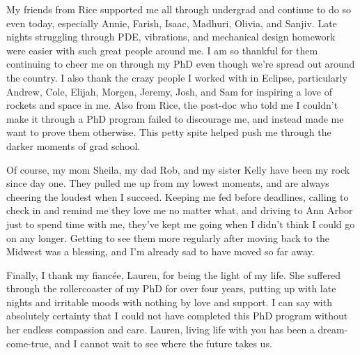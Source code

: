 My friends from Rice supported me all through undergrad and continue to do so even today, especially Annie, Farish, Isaac, Madhuri, Olivia, and Sanjiv. Late nights struggling through PDE, vibrations, and mechanical design homework were easier with such great people around me. I am so thankful for them continuing to cheer me on through my PhD even though we're spread out around the country. I also thank the crazy people I worked with in Eclipse, particularly Andrew, Cole, Elijah, Morgen, Jeremy, Josh, and Sam for inspiring a love of rockets and space in me. Also from Rice, the post-doc who told me I couldn't make it through a PhD program failed to discourage me, and instead made me want to prove them otherwise. This petty spite helped push me through the darker moments of grad school.

Of course, my mom Sheila, my dad Rob, and my sister Kelly have been my rock since day one. They pulled me up from my lowest moments, and are always cheering the loudest when I succeed. Keeping me fed before deadlines, calling to check in and remind me they love me no matter what, and driving to Ann Arbor just to spend time with me, they've kept me going when I didn't think I could go on any longer. Getting to see them more regularly after moving back to the Midwest was a blessing, and I'm already sad to have moved so far away. 

Finally, I thank my fianc\'{e}e, Lauren, for being the light of my life. She suffered through the rollercoaster of my PhD for over four years, putting up with late nights and irritable moods with nothing by love and support. I can say with absolutely certainty that I could not have completed this PhD program without her endless compassion and care. Lauren, living life with you has been a dream-come-true, and I cannot wait to see where the future takes us.
